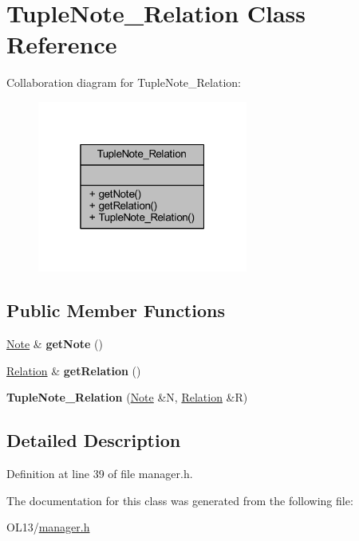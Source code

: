 \hypertarget{class_tuple_note___relation}{}\section{Tuple\+Note\+\_\+\+Relation Class Reference}
\label{class_tuple_note___relation}


Collaboration diagram for Tuple\+Note\+\_\+\+Relation\+:\nopagebreak
\begin{figure}[H]
\begin{center}
\leavevmode
\includegraphics[width=196pt]{class_tuple_note___relation__coll__graph}
\end{center}
\end{figure}
\subsection*{Public Member Functions}
\begin{DoxyCompactItemize}
\item 
\mbox{\label{class_tuple_note___relation_a2bb8e84363d2bab8cd03742144a06ef9}} 
\hyperlink{class_note}{Note} \& {\bfseries get\+Note} ()
\item 
\mbox{\label{class_tuple_note___relation_a0e6d2fca79e715c85d4a4793da2bb381}} 
\hyperlink{class_relation}{Relation} \& {\bfseries get\+Relation} ()
\item 
\mbox{\label{class_tuple_note___relation_adc3d9a6e637361eedd2e561ae957e1fb}} 
{\bfseries Tuple\+Note\+\_\+\+Relation} (\hyperlink{class_note}{Note} \&N, \hyperlink{class_relation}{Relation} \&R)
\end{DoxyCompactItemize}


\subsection{Detailed Description}


Definition at line 39 of file manager.\+h.



The documentation for this class was generated from the following file\+:\begin{DoxyCompactItemize}
\item 
O\+L13/\hyperlink{manager_8h}{manager.\+h}\end{DoxyCompactItemize}
